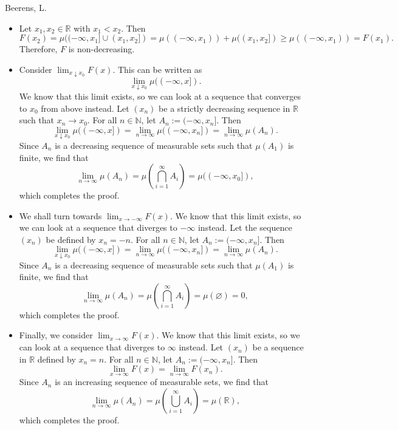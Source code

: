 \begin{solution}[3.11]{Beerens, L.}
    \begin{itemize}
        \item Let $x_1,x_2\in\mathbb{R}$ with $x_1<x_2$. Then
        $$
            F(x_2) = \mu((-\infty,x_1]\cup (x_1,x_2]) = \mu((-\infty, x_1)) + \mu((x_1,x_2])\geq\mu((-\infty, x_1)) = F(x_1).
        $$
        Therefore, $F$ is non-decreasing.
        
        \item Consider $\lim_{x\downarrow x_0}F(x)$. This can be written as 
        $$
            \lim_{x\downarrow x_0}\mu((-\infty,x]).
        $$
        We know that this limit exists, so we can look at a sequence that converges to $x_0$ from above instead. Let $(x_n)$ be a strictly decreasing sequence in $\mathbb{R}$ such that $x_n\rightarrow x_0$. For all $n\in\mathbb{N}$, let $A_n:=(-\infty,x_n]$. Then
        $$
            \lim_{x\downarrow x_0}\mu((-\infty,x]) = \lim_{n\rightarrow \infty}\mu((-\infty,x_n]) = \lim_{n\rightarrow \infty}\mu(A_n).
        $$
        Since $A_n$ is a decreasing sequence of measurable sets such that $\mu(A_1)$ is finite, we find that
        $$
            \lim_{n\rightarrow \infty}\mu(A_n) = \mu\left( \bigcap_{i=1}^\infty A_i \right) = \mu((-\infty, x_0]),
        $$
        which completes the proof.
        
        \item We shall turn towards $\lim_{x\rightarrow -\infty}F(x)$. We know that this limit exists, so we can look at a sequence that diverges to $-\infty$ instead. Let the sequence $(x_n)$ be defined by $x_n = -n$. For all $n\in\mathbb{N}$, let $A_n:=(-\infty,x_n]$. Then
        $$
            \lim_{x\downarrow x_0}\mu((-\infty,x]) = \lim_{n\rightarrow \infty}\mu((-\infty,x_n]) = \lim_{n\rightarrow \infty}\mu(A_n).
        $$
        Since $A_n$ is a decreasing sequence of measurable sets such that $\mu(A_1)$ is finite, we find that
        $$
            \lim_{n\rightarrow \infty}\mu(A_n) = \mu\left( \bigcap_{i=1}^\infty A_i \right) = \mu(\varnothing) = 0,
        $$
        which completes the proof.
        
        \item Finally, we consider $\lim_{x\rightarrow \infty}F(x)$. We know that this limit exists, so we can look at a sequence that diverges to $\infty$ instead. Let $(x_n)$ be a sequence in $\mathbb{R}$ defined by $x_n = n$. For all $n\in\mathbb{N}$, let $A_n:=(-\infty,x_n]$. Then
        $$
            \lim_{x\rightarrow \infty}F(x) = \lim_{n\rightarrow \infty}F(x_n).
        $$
        Since $A_n$ is an increasing sequence of measurable sets, we find that
        $$
            \lim_{n\rightarrow \infty}\mu(A_n) = \mu\left( \bigcup_{i=1}^\infty A_i \right) = \mu(\mathbb{R}),
        $$
        which completes the proof.
    \end{itemize}
\end{solution}

